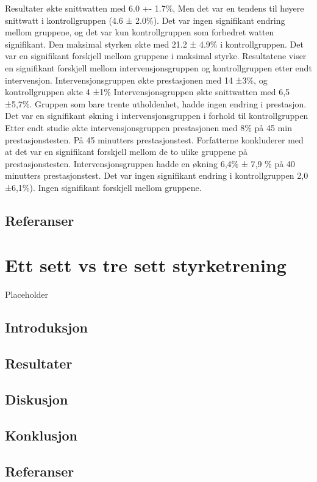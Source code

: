 \documentclass[
]{book}
\begin{document}
Resultater \citep{rønnestad2010b} økte snittwatten med 6.0 +- 1.7\%, Men det var en tendens til høyere snittwatt i kontrollgruppen (4.6 ± 2.0\%). Det var ingen signifikant endring mellom gruppene, og det var kun kontrollgruppen som forbedret watten signifikant. Den maksimal styrken økte med 21.2 ± 4.9\% i kontrollgruppen. Det var en signifikant forskjell mellom gruppene i maksimal styrke. \citet{rønnestad2010a} Resultatene viser en signifikant forskjell mellom intervensjonsgruppen og kontrollgruppen etter endt intervensjon. Intervensjonsgruppen økte prestasjonen med 14 ±3\%, og kontrollgruppen økte 4 ±1\% \citet{rønnestad2015} Intervensjonsgruppen økte snittwatten med 6,5 ±5,7\%. Gruppen som bare trente utholdenhet, hadde ingen endring i prestasjon. Det var en signifikant økning i intervensjonsgruppen i forhold til kontrollgruppen \citet{aagaard2011} Etter endt studie økte intervensjonsgruppen prestasjonen med 8\% på 45 min prestasjonstesten. På 45 minutters prestasjonstest. Forfatterne konkluderer med at det var en signifikant forskjell mellom de to ulike gruppene på prestasjonstesten. \citet{vikmoen2016} Intervensjonsgruppen hadde en økning 6,4\% ± 7,9 \% på 40 minutters prestasjonstest. Det var ingen signifikant endring i kontrollgruppen 2,0 ±6,1\%). Ingen signifikant forskjell mellom gruppene.

\hypertarget{referanser-2}{%
\section{Referanser}\label{referanser-2}}

\hypertarget{ett-sett-vs-tre-sett-styrketrening}{%
\chapter{Ett sett vs tre sett styrketrening}\label{ett-sett-vs-tre-sett-styrketrening}}

Placeholder

\hypertarget{introduksjon-1}{%
\section{Introduksjon}\label{introduksjon-1}}

\hypertarget{resultater-1}{%
\section{Resultater}\label{resultater-1}}

\hypertarget{diskusjon-1}{%
\section{Diskusjon}\label{diskusjon-1}}

\hypertarget{konklusjon}{%
\section{Konklusjon}\label{konklusjon}}

\hypertarget{referanser-3}{%
\section{Referanser}\label{referanser-3}}

  
\end{document}
